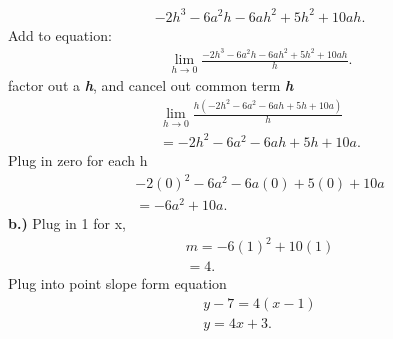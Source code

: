 \documentclass{report}
\begin{document}
    \begin{align*}
        -2h^3-6a^2h-6ah^2+5h^2+10ah
    .\end{align*}
    \bigbreak \noindent 
    Add to equation:
    \begin{align*}
        \lim\limits_{h \to 0}{ \frac{-2h^3-6a^2h-6ah^2+5h^2+10ah}{h}}
    .\end{align*}
    \bigbreak \noindent 
    factor out a \textbf{\textit{h}}, and cancel out common term \textbf{\textit{h}}
    \begin{align*}
        \lim\limits_{h \to 0}{ \frac{h \left(-2h^2-6a^2-6ah+5h+10a\right)}{h}} \\
        =-2h^2-6a^2-6ah+5h+10a 
    .\end{align*}
    \bigbreak \noindent 
    Plug in zero for each h
    \begin{align*}
        -2 \left(0\right)^2-6a^2-6a \left(0\right) + 5 \left(0\right)+10a \\
        = -6a^2+10a
    .\end{align*}
    \bigbreak \noindent \bigbreak \noindent 
    \textbf{b.)}
    Plug in 1 for x,
    \begin{align*}
        m = -6 \left(1\right)^2 + 10 \left(1\right) \\ 
        = 4
    .\end{align*}
    \bigbreak \noindent 
    Plug into point slope form equation 
    \begin{align*}
        y - 7 = 4 \left(x - 1\right) \\ 
        y = 4x+3
    .\end{align*}
\end{document}
